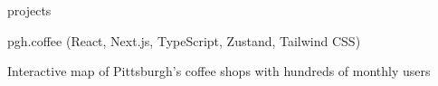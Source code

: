 \documentclass{resume} %
\begin{document}

 \begin{rSection}
 {projects
 }

   \begin{rSubsection}{pgh.coffee {\normalfont (React, Next.js, TypeScript, Zustand, Tailwind CSS)}}{}{}{}
   \item Interactive map of Pittsburgh's coffee shops with hundreds of monthly users
   \item \href{https://pgh.coffee/}{} \textbar \ \href{https://github.com/Johngeorgesample/pgh-coffee}{}
   \end{rSubsection}





\end{rSection}
\end{document}
